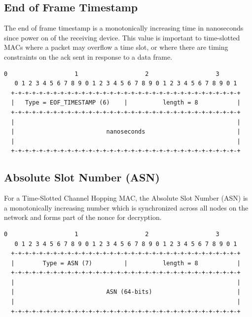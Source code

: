 \documentclass[12pt]{article}
\renewcommand\_{\textunderscore\allowbreak}
\begin{document}
\subsection{End of Frame Timestamp}

The end of frame timestamp is a monotonically increasing time in nanoseconds
since power on of the receiving device.  This value is important to
time-slotted MACs where a packet may overflow a time slot, or where there are
timing constraints on the ack sent in response to a data frame.

\begin{Verbatim}[samepage=true]
   0                   1                   2                   3
   0 1 2 3 4 5 6 7 8 9 0 1 2 3 4 5 6 7 8 9 0 1 2 3 4 5 6 7 8 9 0 1
  +-+-+-+-+-+-+-+-+-+-+-+-+-+-+-+-+-+-+-+-+-+-+-+-+-+-+-+-+-+-+-+-+
  |   Type = EOF_TIMESTAMP (6)    |          length = 8           |
  +-+-+-+-+-+-+-+-+-+-+-+-+-+-+-+-+-+-+-+-+-+-+-+-+-+-+-+-+-+-+-+-+
  |                                                               |
  |                          nanoseconds                          |
  |                                                               |
  +-+-+-+-+-+-+-+-+-+-+-+-+-+-+-+-+-+-+-+-+-+-+-+-+-+-+-+-+-+-+-+-+
\end{Verbatim}

\newpage
\subsection{Absolute Slot Number (ASN)}

For a Time-Slotted Channel Hopping MAC, the Absolute Slot Number (ASN)
is a monotonically increasing number which is synchronized across all nodes on
the network and forms part of the nonce for decryption.

\begin{Verbatim}[samepage=true]
   0                   1                   2                   3
   0 1 2 3 4 5 6 7 8 9 0 1 2 3 4 5 6 7 8 9 0 1 2 3 4 5 6 7 8 9 0 1
  +-+-+-+-+-+-+-+-+-+-+-+-+-+-+-+-+-+-+-+-+-+-+-+-+-+-+-+-+-+-+-+-+
  |        Type = ASN (7)         |          length = 8           |
  +-+-+-+-+-+-+-+-+-+-+-+-+-+-+-+-+-+-+-+-+-+-+-+-+-+-+-+-+-+-+-+-+
  |                                                               |
  |                          ASN (64-bits)                        |
  |                                                               |
  +-+-+-+-+-+-+-+-+-+-+-+-+-+-+-+-+-+-+-+-+-+-+-+-+-+-+-+-+-+-+-+-+
\end{Verbatim}
\end{document}
